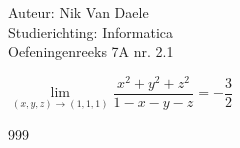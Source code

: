 \documentclass[a4paper]{article}
\newcommand{\llim}{\lim\limits}
\begin{document}
  
\noindent \large Auteur: Nik Van Daele \\
\noindent \large Studierichting: Informatica\\
\noindent \large Oefeningenreeks 7A nr. 2.1\\

\medskip

\normalsize

$\llim_{(x,y,z) \rightarrow (1,1,1)} \dfrac{x^2 + y^2 + z^2}{1 - x - y - z} = -\dfrac{3}{2}$\\

\begin{thebibliography}{999}
\end{thebibliography}
\end{document}
